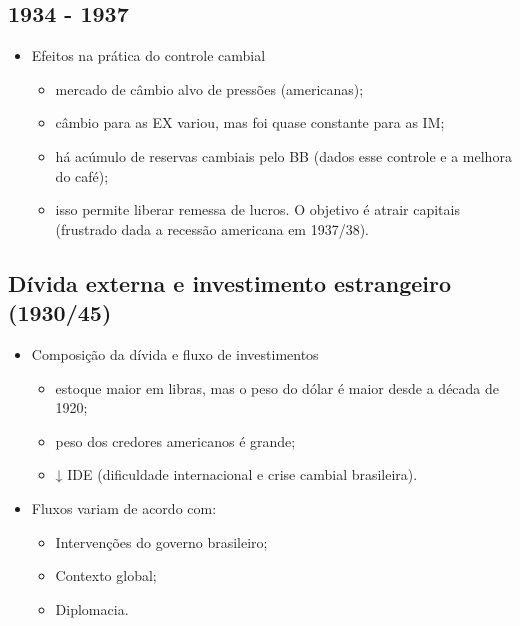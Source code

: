 \documentclass[a4paper,12pt]{article}[abntex2]
\begin{document}
\subsection{\textbf{1934 - 1937}}
\begin{itemize}
    \item Efeitos na prática do controle cambial
    \begin{itemize}
        \item mercado de câmbio alvo de pressões
(americanas);
\item câmbio para as EX variou, mas foi quase constante para as IM;
\item há acúmulo de reservas cambiais pelo BB (dados esse controle e a melhora do café);
\item isso permite liberar remessa de lucros. O objetivo é atrair capitais (frustrado dada a recessão americana em 1937/38).

    \end{itemize}
\end{itemize}

\subsection{Dívida externa e investimento estrangeiro (1930/45)}
\begin{itemize}
    \item Composição da dívida e fluxo de investimentos
    \begin{itemize}
        \item estoque maior em libras, mas o peso do dólar é maior desde a década de 1920;
        \item peso dos credores americanos é grande;
        \item ↓ IDE (dificuldade internacional e crise cambial brasileira).
    \end{itemize}
    \item Fluxos variam de acordo com:
    \begin{itemize}
        \item Intervenções do governo brasileiro;
        \item Contexto global;
        \item Diplomacia.
    \end{itemize}
\end{itemize}
\end{document}
